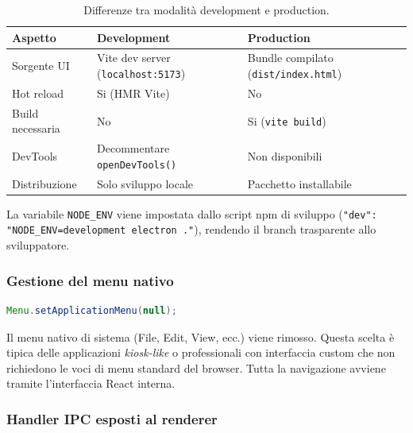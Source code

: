 \documentclass[a4paper,12pt]{article}
\begin{document}
\noindent \begin{table}[H]
\centering\small
\caption{Differenze tra modalit\`{a} development e production.}
\begin{tabular}{L{3cm} L{4.5cm} L{5cm}}
\toprule
\textbf{Aspetto} & \textbf{Development} & \textbf{Production} \\
\midrule
Sorgente UI & Vite dev server (\texttt{localhost:5173}) &
  Bundle compilato (\texttt{dist/index.html}) \\
Hot reload & Si (HMR Vite) & No \\
Build necessaria & No & Si (\texttt{vite build}) \\
DevTools & Decommentare \texttt{openDevTools()} & Non disponibili \\
Distribuzione & Solo sviluppo locale & Pacchetto installabile \\
\bottomrule
\end{tabular}
\end{table}

La variabile \texttt{NODE\_ENV} viene impostata dallo script npm
di sviluppo (\texttt{"dev": "NODE\_\allowbreak{}ENV=development electron ."}),
rendendo il branch trasparente allo sviluppatore.

\subsubsection{Gestione del menu nativo}
\vspace{2pt}
\begin{lstlisting}[language=Java, caption={Rimozione del menu nativo.}]
Menu.setApplicationMenu(null);
\end{lstlisting}

\noindent Il menu nativo di sistema (File, Edit, View, ecc.) viene rimosso.
Questa scelta \`{e} tipica delle applicazioni \textit{kiosk-like} o
professionali con interfaccia custom che non richiedono le voci di
menu standard del browser. Tutta la navigazione avviene tramite
l'interfaccia React interna.

\subsubsection{Handler IPC esposti al renderer}
\end{document}
